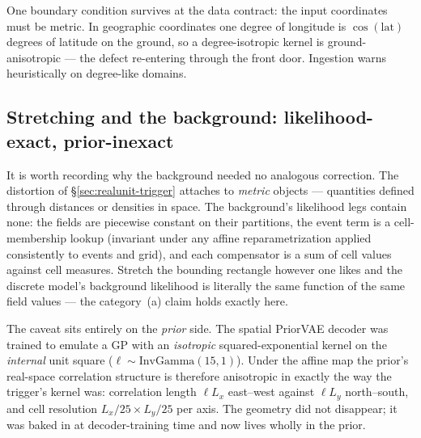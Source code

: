 One boundary condition survives at the data contract: the input coordinates
must be metric. In geographic coordinates one degree of longitude is
$\cos(\mathrm{lat})$ degrees of latitude on the ground, so a
degree-isotropic kernel is ground-anisotropic --- the defect re-entering
through the front door. Ingestion warns heuristically on degree-like
domains.

\subsection{Stretching and the background: likelihood-exact, prior-inexact}
\label{sec:background-stretch}

It is worth recording why the background needed no analogous correction.
The distortion of \S\ref{sec:realunit-trigger} attaches to \emph{metric}
objects --- quantities defined through distances or densities in space. The
background's likelihood legs contain none: the fields are piecewise constant
on their partitions, the event term is a cell-membership lookup (invariant
under any affine reparametrization applied consistently to events and
grid), and each compensator is a sum of cell values against cell measures.
Stretch the bounding rectangle however one likes and the discrete model's
background likelihood is literally the same function of the same field
values --- the category~(a) claim holds exactly here.

The caveat sits entirely on the \emph{prior} side. The spatial PriorVAE
decoder was trained to emulate a GP with an \emph{isotropic}
squared-exponential kernel on the \emph{internal} unit square
($\ell \sim \mathrm{InvGamma}(15,1)$). Under the affine map the prior's
real-space correlation structure is therefore anisotropic in exactly the way
the trigger's kernel was: correlation length $\ell L_x$ east--west against
$\ell L_y$ north--south, and cell resolution $L_x/25 \times L_y/25$ per
axis. The geometry did not disappear; it was baked in at decoder-training
time and now lives wholly in the prior.

